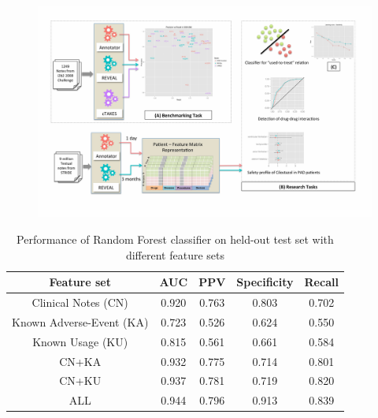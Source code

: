 \begin{figure}
  \begin{center}
    \includegraphics[width=0.9\linewidth]{ch4-figures/Figure1.pdf}
  \end{center}
  \caption{}
  \label{fig:short}
\end{figure}

\begin{table}
\begin{center}
\begin{tabular}{|c|c|c|c|c||}
  \hline Feature set & AUC & PPV & Specificity & Recall \\
  \hline
  \hline
  Clinical Notes (CN) & 0.920 & 0.763 & 0.803 & 0.702\\
  Known Adverse-Event (KA) & 0.723 & 0.526 & 0.624 & 0.550 \\
  Known Usage (KU) & 0.815 & 0.561 & 0.661 & 0.584 \\
  CN+KA & 0.932 & 0.775 & 0.714 & 0.801 \\
  CN+KU & 0.937 & 0.781 & 0.719 & 0.820 \\
  ALL & 0.944 & 0.796 & 0.913 & 0.839 \\
  \hline
\end{tabular}
\end{center}
\caption{Performance of Random Forest classifier on held-out test set
  with different feature sets}
\end{table}

